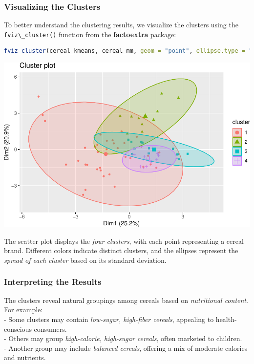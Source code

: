 \documentclass[
]{book}
\newcommand{\passthrough}[1]{#1}
\theoremstyle{definition}
\theoremstyle{definition}
\theoremstyle{definition}
\theoremstyle{definition}
\theoremstyle{remark}
\begin{document}
\subsubsection*{Visualizing the Clusters}\label{visualizing-the-clusters}

To better understand the clustering results, we visualize the clusters using the \passthrough{\lstinline!fviz\_cluster()!} function from the \textbf{factoextra} package:

\begin{lstlisting}[language=R]
fviz_cluster(cereal_kmeans, cereal_mm, geom = "point", ellipse.type = "norm", palette = "custom_palette")
\end{lstlisting}

\begin{center}\includegraphics[width=0.7\linewidth]{clustering_files/figure-latex/unnamed-chunk-14-1} \end{center}

The scatter plot displays the \emph{four clusters}, with each point representing a cereal brand. Different colors indicate distinct clusters, and the ellipses represent the \emph{spread of each cluster} based on its standard deviation.

\subsubsection*{Interpreting the Results}\label{interpreting-the-results}

The clusters reveal natural groupings among cereals based on \emph{nutritional content}. For example:\\
- Some clusters may contain \emph{low-sugar, high-fiber cereals}, appealing to health-conscious consumers.\\
- Others may group \emph{high-calorie, high-sugar cereals}, often marketed to children.\\
- Another group may include \emph{balanced cereals}, offering a mix of moderate calories and nutrients.
\end{document}
